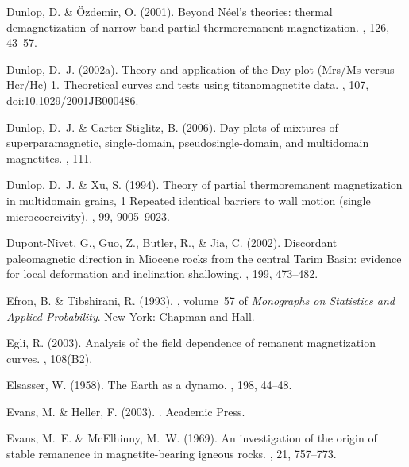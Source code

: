 Dunlop, D. \& \"Ozdemir, O. (2001).
\newblock Beyond N\'eel's theories: thermal demagnetization of narrow-band
  partial thermoremanent magnetization.
, 126, 43--57.

Dunlop, D.~J. (2002a).
\newblock Theory and application of the Day plot (Mrs/Ms versus Hcr/Hc) 1.
  Theoretical curves and tests using titanomagnetite data.
, 107, doi:10.1029/2001JB000486.

Dunlop, D.~J. \& Carter-Stiglitz, B. (2006).
\newblock Day plots of mixtures of superparamagnetic, single-domain,
  pseudosingle-domain, and multidomain magnetites.
, 111.

Dunlop, D.~J. \& Xu, S. (1994).
\newblock Theory of partial thermoremanent magnetization in multidomain grains,
  1 Repeated identical barriers to wall motion (single microcoercivity).
, 99, 9005--9023.

Dupont-Nivet, G., Guo, Z., Butler, R., \& Jia, C. (2002).
\newblock Discordant paleomagnetic direction in Miocene rocks from the central
  Tarim Basin: evidence for local deformation and inclination shallowing.
, 199, 473--482.

Efron, B. \& Tibshirani, R. (1993).
, volume~57 of {\em Monographs
  on Statistics and Applied Probability}.
\newblock New York: Chapman and Hall.

Egli, R. (2003).
\newblock Analysis of the field dependence of remanent magnetization curves.
, 108(B2).

Elsasser, W. (1958).
\newblock The Earth as a dynamo.
, 198, 44--48.

Evans, M. \& Heller, F. (2003).
.
\newblock Academic Press.

Evans, M.~E. \& McElhinny, M.~W. (1969).
\newblock An investigation of the origin of stable remanence in
  magnetite-bearing igneous rocks.
, 21, 757--773.

